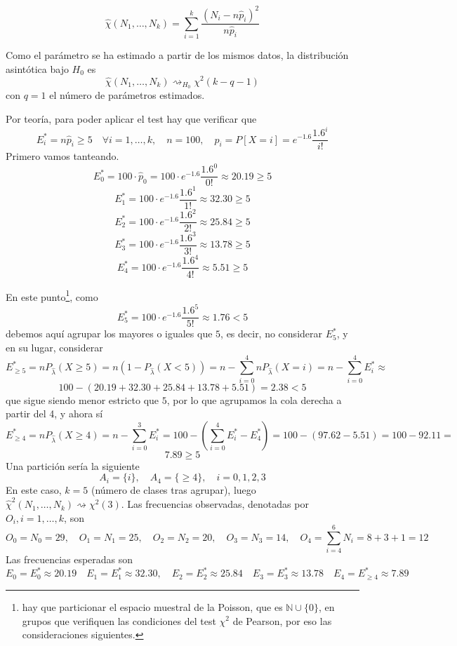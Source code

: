 \documentclass[12pt]{article}
\newcommand{\N}{\mathbb{N}}
\begin{document}
\begin{ejercicio}[1 punto]
        $$\hat{\chi}(N_1, \ldots, N_k) = \sum_{i=1}^k \dfrac{(N_i - n \hat{p}_i)^2}{n \hat{p}_i}$$

        Como el parámetro se ha estimado a partir de los mismos datos, la distribución asintótica bajo $H_0$ es 
        $$\hat{\chi}(N_1, \ldots, N_k) \rightsquigarrow_{H_0} \chi^2(k - q - 1)$$
        con $q=1$ el número de parámetros estimados.

        Por teoría, para poder aplicar el test hay que verificar que $$E^*_{i} = n\hat{p}_i \geqslant 5 \quad \forall i = 1, \ldots, k, \quad n = 100, \quad \hat{p}_i = P[X=i] = e^{-1.6} \dfrac{{1.6}^i}{i!}$$
        Primero vamos tanteando.
        $$E^*_0 = 100 \cdot \hat{p}_0 = 100 \cdot e^{-{1.6}} \dfrac{{1.6}^0}{0!} \approx 20.19 \geq 5$$
        $$E^*_1 = 100 \cdot e^{-{1.6}} \dfrac{{1.6}^1}{1!} \approx 32.30 \geq 5$$
        $$E^*_2 = 100 \cdot e^{-{1.6}} \dfrac{{1.6}^2}{2!} \approx 25.84 \geq 5$$
        $$E^*_3 = 100 \cdot e^{-{1.6}} \dfrac{{1.6}^3}{3!} \approx 13.78 \geq 5$$
        $$E^*_4 = 100 \cdot e^{-{1.6}} \dfrac{{1.6}^4}{4!} \approx 5.51 \geq 5$$
        
        En este punto\footnote{hay que particionar el espacio muestral de la Poisson, que
        es $\N \cup \{0\}$, en grupos que verifiquen las condiciones del test $\chi^2$ de Pearson, por eso las consideraciones siguientes.}, como $$E^*_5 = 100 \cdot e^{-{1.6}} \dfrac{{1.6}^5}{5!} \approx 1.76 < 5$$ debemos aquí agrupar los mayores o iguales que $5$, es decir, no considerar $E^*_5$, y en su lugar, considerar
        $$E^*_{\geq 5} = n P_{\hat{\lambda}}(X \geq 5) = n (1 - P_{\hat{\lambda}}(X < 5)) = n - \sum_{i=0}^{4} n P_{\hat{\lambda}}(X = i) =  n - \sum_{i=0}^{4} E_i^* \approx $$
        $$100 - (20.19 + 32.30 + 25.84 + 13.78 + 5.51) = 2.38 < 5$$
        que sigue siendo menor estricto que $5$, por lo que agrupamos la cola derecha a partir del 4, y ahora sí
        $$E^*_{\geq 4} = n P_{\hat{\lambda}}(X \geq 4) = n - \sum_{i=0}^{3} E_i^* = 100 - \left(\sum_{i=0}^{4} E_i^* - E_4^* \right) = 100 - (97.62 - 5.51) = 100 - 92.11 = $$
        $$7.89 \geq 5$$
        Una partición sería la siguiente
        $$A_i = \{i\}, \quad A_4 = \{\geqslant 4\}, \quad i = 0,1,2,3$$
        En este caso, $k=5$ (número de clases tras agrupar), luego
        $\hat{\chi}^2(N_1, \ldots, N_k) \rightsquigarrow \chi^2(3)$. Las frecuencias observadas, denotadas por $O_i, i= 1,\ldots,k$, son 
        $$O_0 = N_0 = 29, \quad O_1 = N_1 = 25, \quad O_2 = N_2 = 20, \quad O_3 = N_3 = 14, \quad O_4 = \sum_{i=4}^{6} N_i = 8+3+1 = 12$$
        Las frecuencias esperadas son 
        $$E_0 = E^*_0 \approx 20.19 \quad E_1 = E^*_1 \approx 32.30, \quad E_2 = E^*_2 \approx 25.84 
        \quad E_3 = E^*_3 \approx 13.78 \quad E_4 = E^*_{\geq 4} \approx 7.89$$


\end{ejercicio}
\end{document}

